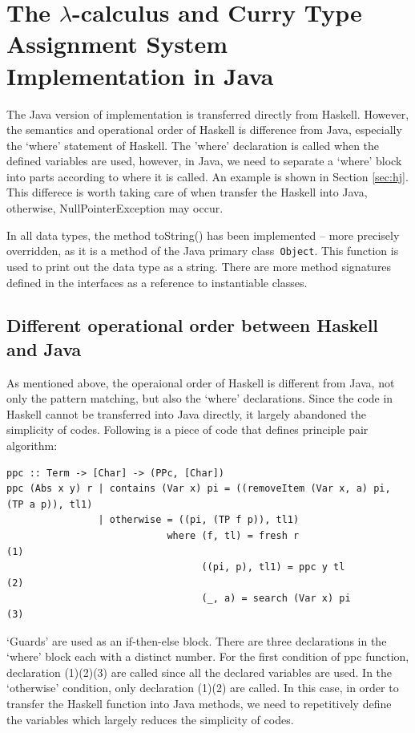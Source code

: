\documentclass[a4paper,11pt,twoside]{report}
\begin{document}
\chapter{The $\lambda$-calculus and Curry Type Assignment System Implementation in Java}
The Java version of implementation is transferred directly from Haskell. However, the semantics and operational order of Haskell is difference from Java, especially the `where' statement of Haskell. The 'where' declaration is called when the defined variables are used, however, in Java, we need to separate a `where' block into parts according to where it is called. An example is shown in Section \ref{sec:hj}. This differece is worth taking care of when transfer the Haskell into Java, otherwise, NullPointerException may occur. 

In all data types, the method toString() has been implemented -- more precisely overridden, as it is a method of the Java primary class\verb| Object|. This function is used to print out the data type as a string. There are more method signatures defined in the interfaces as a reference to instantiable classes. 

\section{Different operational order between Haskell and Java}{\label{sec:hj}}
As mentioned above, the operaional order of Haskell is different from Java, not only the pattern matching, but also the `where' declarations. Since the code in Haskell cannot be transferred into Java directly, it largely abandoned the simplicity of codes. Following is a piece of code that defines principle pair algorithm:
\begin{verbatim}
ppc :: Term -> [Char] -> (PPc, [Char])
ppc (Abs x y) r | contains (Var x) pi = ((removeItem (Var x, a) pi, (TP a p)), tl1)
                | otherwise = ((pi, (TP f p)), tl1)
                            where (f, tl) = fresh r                    (1) 
                                  ((pi, p), tl1) = ppc y tl            (2)
                                  (_, a) = search (Var x) pi           (3)

\end{verbatim}

`Guards' are used as an if-then-else block. There are three declarations in the `where' block each with a distinct number. For the first condition of ppc function, declaration (1)(2)(3) are called since all the declared variables are used. In the `otherwise' condition, only declaration (1)(2) are called. In this case, in order to transfer the Haskell function into Java methods, we need to repetitively define the variables which largely reduces the simplicity of codes. 
\end{document}
